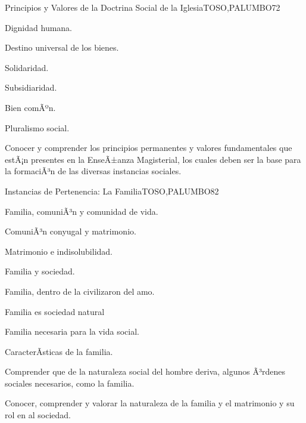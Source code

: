 \begin{syllabus}
\begin{unit}{Principios y Valores de la Doctrina Social de  la Iglesia}{TOSO,PALUMBO}{7}{2}
\begin{topics}
	\item Dignidad humana.
	\item Destino universal de los bienes.
	\item Solidaridad.
	\item Subsidiaridad.
	\item Bien comÃºn.
	\item Pluralismo social. 
\end{topics}
\begin{unitgoals}
	\item Conocer y comprender los principios permanentes y valores fundamentales que estÃ¡n presentes en la EnseÃ±anza Magisterial, los cuales deben ser la base para la formaciÃ³n de las diversas instancias sociales.
\end{unitgoals}
\end{unit}

\begin{unit}{Instancias de Pertenencia: La Familia}{TOSO,PALUMBO}{8}{2}
\begin{topics}
	\item Familia, comuniÃ³n y comunidad de vida.
	\item ComuniÃ³n conyugal y matrimonio. 
	\item Matrimonio e indisolubilidad.
	\item Familia y sociedad.
	\item Familia, dentro de la civilizaron del amo.
	\item Familia es sociedad natural
	\item Familia necesaria para la vida social.
	\item CaracterÃ­sticas de la familia.
\end{topics}
\begin{unitgoals}
	\item Comprender que de la naturaleza social del hombre deriva, algunos Ã³rdenes sociales necesarios, como la familia.
	\item Conocer, comprender y valorar la naturaleza de la familia y el matrimonio y su rol en al sociedad.
\end{unitgoals}
\end{unit}


\end{syllabus}
